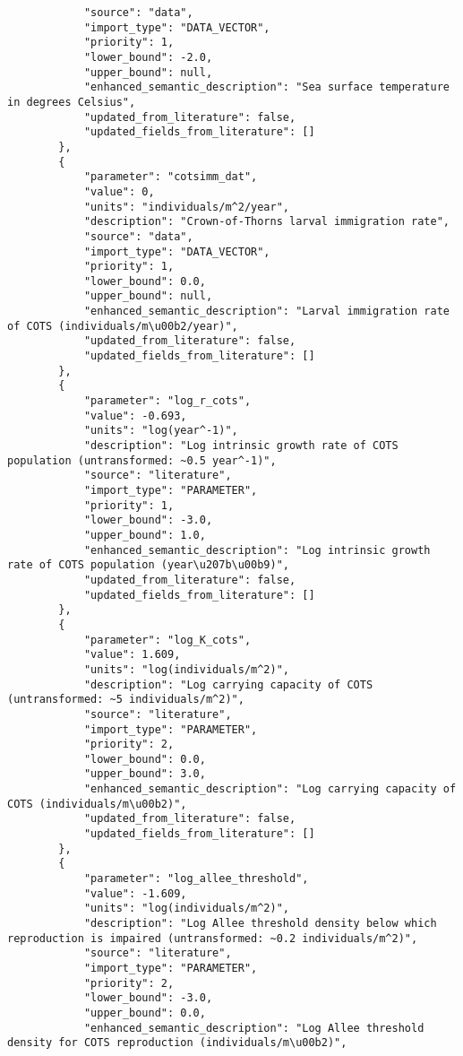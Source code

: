 \begin{lstlisting}
            "source": "data",
            "import_type": "DATA_VECTOR",
            "priority": 1,
            "lower_bound": -2.0,
            "upper_bound": null,
            "enhanced_semantic_description": "Sea surface temperature in degrees Celsius",
            "updated_from_literature": false,
            "updated_fields_from_literature": []
        },
        {
            "parameter": "cotsimm_dat",
            "value": 0,
            "units": "individuals/m^2/year",
            "description": "Crown-of-Thorns larval immigration rate",
            "source": "data",
            "import_type": "DATA_VECTOR",
            "priority": 1,
            "lower_bound": 0.0,
            "upper_bound": null,
            "enhanced_semantic_description": "Larval immigration rate of COTS (individuals/m\u00b2/year)",
            "updated_from_literature": false,
            "updated_fields_from_literature": []
        },
        {
            "parameter": "log_r_cots",
            "value": -0.693,
            "units": "log(year^-1)",
            "description": "Log intrinsic growth rate of COTS population (untransformed: ~0.5 year^-1)",
            "source": "literature",
            "import_type": "PARAMETER",
            "priority": 1,
            "lower_bound": -3.0,
            "upper_bound": 1.0,
            "enhanced_semantic_description": "Log intrinsic growth rate of COTS population (year\u207b\u00b9)",
            "updated_from_literature": false,
            "updated_fields_from_literature": []
        },
        {
            "parameter": "log_K_cots",
            "value": 1.609,
            "units": "log(individuals/m^2)",
            "description": "Log carrying capacity of COTS (untransformed: ~5 individuals/m^2)",
            "source": "literature",
            "import_type": "PARAMETER",
            "priority": 2,
            "lower_bound": 0.0,
            "upper_bound": 3.0,
            "enhanced_semantic_description": "Log carrying capacity of COTS (individuals/m\u00b2)",
            "updated_from_literature": false,
            "updated_fields_from_literature": []
        },
        {
            "parameter": "log_allee_threshold",
            "value": -1.609,
            "units": "log(individuals/m^2)",
            "description": "Log Allee threshold density below which reproduction is impaired (untransformed: ~0.2 individuals/m^2)",
            "source": "literature",
            "import_type": "PARAMETER",
            "priority": 2,
            "lower_bound": -3.0,
            "upper_bound": 0.0,
            "enhanced_semantic_description": "Log Allee threshold density for COTS reproduction (individuals/m\u00b2)",

\end{lstlisting}
